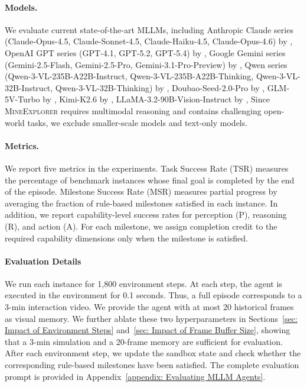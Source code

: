 \documentclass[11pt]{article}
\begin{document}
\paragraph{Models.}
We evaluate current state-of-the-art MLLMs, including 
Anthropic Claude series (Claude-Opus-4.5, Claude-Sonnet-4.5, Claude-Haiku-4.5, Claude-Opus-4.6) by \citet{Claude-Opus-4.5, Claude-Haiku-4.5, Claude-Sonnet-4.5, Claude-Opus-4.6}, 
OpenAI GPT series (GPT-4.1, GPT-5.2, GPT-5.4) by \citet{GPT-4, GPT-5}, 
Google Gemini series (Gemini-2.5-Flash, Gemini-2.5-Pro, Gemini-3.1-Pro-Preview) by \citet{Gemini-2.5, Gemini-3.1-Pro}, 
Qwen series (Qwen-3-VL-235B-A22B-Instruct, Qwen-3-VL-235B-A22B-Thinking, Qwen-3-VL-32B-Instruct, Qwen-3-VL-32B-Thinking) by \citet{Qwen-3-VL}, 
Doubao-Seed-2.0-Pro by \citet{Seed2.0}, 
GLM-5V-Turbo by \citet{GLM-5V-Turbo}, 
Kimi-K2.6 by \citet{Kimi-K2}, 
LLaMA-3.2-90B-Vision-Instruct by \citet{Llama-3}, 
Since \textsc{MineExplorer} requires multimodal reasoning and contains challenging open-world tasks, we exclude smaller-scale models and text-only models.

\paragraph{Metrics.} 
We report five metrics in the experiments. 
Task Success Rate (TSR) measures the percentage of benchmark instances whose final goal is completed by the end of the episode. 
Milestone Success Rate (MSR) measures partial progress by averaging the fraction of rule-based milestones satisfied in each instance. 
In addition, we report capability-level success rates for perception (P), reasoning (R), and action (A). 
For each milestone, we assign completion credit to the required capability dimensions only when the milestone is satisfied. 

\paragraph{Evaluation Details}
We run each instance for 1,800 environment steps. 
At each step, the agent is executed in the environment for 0.1 seconds. 
Thus, a full episode corresponds to a 3-min interaction video. 
We provide the agent with at most 20 historical frames as visual memory. 
We further ablate these two hyperparameters in Sections~\ref {sec: Impact of Environment Steps} and~\ref{sec: Impact of Frame Buffer Size}, showing that a 3-min simulation and a 20-frame memory are sufficient for evaluation. 
After each environment step, we update the sandbox state and check whether the corresponding rule-based milestones have been satisfied. 
The complete evaluation prompt is provided in Appendix~\ref{appendix: Evaluating MLLM Agents}.
\end{document}
